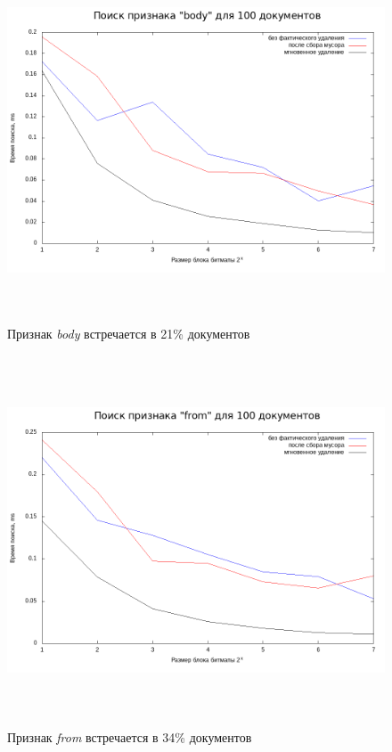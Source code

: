 \begin{figure}[H]
\includegraphics[width=\linewidth, height=10cm]{fig/limit_1e6/1e2/body_time.png}
\caption{Признак \textit{body} встречается в 21\% документов}
\includegraphics[width=\linewidth, height=11cm]{fig/limit_1e6/1e2/from_time.png}
\caption{Признак \textit{from} встречается в 34\% документов}
\end{figure}

